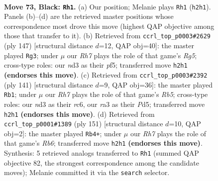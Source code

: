 \documentclass[11pt]{article}
\begin{document}
\clearpage

\begin{figure}[p]\centering
\begin{subfigure}{0.46\textwidth}\centering
\resizebox{\linewidth}{!}{%
\newchessgame
\chessboard[
  setfen={8/8/1k6/8/8/R2N2K1/6Pr/8 b - - 11 73},
  showmover=false,
  pgfstyle=straightmove, color=movearrow, markmove={h2-h1}
]}
\caption{}
\end{subfigure}\hfill
\begin{subfigure}{0.46\textwidth}\centering
\resizebox{\linewidth}{!}{%
\newchessgame
\chessboard[
  setfen={6k1/1R6/8/5P1K/6rP/8/8/8 b - - 14 74},
  showmover=false,
  pgfstyle=straightmove, color=movearrow, markmove={g4-g3}
]}
\caption{}
\end{subfigure}
\\[4pt]
\begin{subfigure}{0.46\textwidth}\centering
\resizebox{\linewidth}{!}{%
\newchessgame
\chessboard[
  setfen={8/8/2R5/3p4/1r1P1k2/2K5/8/8 b - - 1 71},
  showmover=false,
  pgfstyle=straightmove, color=movearrow, markmove={b4-b1}
]}
\caption{}
\end{subfigure}\hfill
\begin{subfigure}{0.46\textwidth}\centering
\resizebox{\linewidth}{!}{%
\newchessgame
\chessboard[
  setfen={6R1/8/7k/8/6K1/1r4P1/8/8 b - - 12 76},
  showmover=false,
  pgfstyle=straightmove, color=movearrow, markmove={b3-b4}
]}
\caption{}
\end{subfigure}
\caption{\textbf{Move 73, Black: \texttt{Rh1}.} (a) Our position; Melanie plays \texttt{Rh1} (\texttt{h2h1}). Panels (b)--(d) are the retrieved master positions whose correspondence most drove this move (highest QAP objective among those that transfer to it). (b) Retrieved from \texttt{ccrl\_top\_p0003\#2629} (ply 147) [structural distance $d$=12, QAP obj=40]: the master played \texttt{Rg3}; under $\mu$ our \emph{Rh7} plays the role of that game's \emph{Rg5}; cross-type roles: our \emph{n}d3 as their \emph{p}f5; transferred move \texttt{h2h1} \textbf{(endorses this move)}. (c) Retrieved from \texttt{ccrl\_top\_p0003\#2392} (ply 141) [structural distance $d$=9, QAP obj=36]: the master played \texttt{Rb1}; under $\mu$ our \emph{Rh7} plays the role of that game's \emph{Rb5}; cross-type roles: our \emph{n}d3 as their \emph{r}c6, our \emph{r}a3 as their \emph{P}d5; transferred move \texttt{h2h1} \textbf{(endorses this move)}. (d) Retrieved from \texttt{ccrl\_top\_p0001\#1389} (ply 151) [structural distance $d$=10, QAP obj=2]: the master played \texttt{Rb4+}; under $\mu$ our \emph{Rh7} plays the role of that game's \emph{Rb6}; transferred move \texttt{h2h1} \textbf{(endorses this move)}. Synthesis: 5 retrieved analogs transferred to \texttt{Rh1} (summed QAP objective 82, the strongest correspondence among the candidate moves); Melanie committed it via the \texttt{search} selector.}
\label{fig:thought-m145}
\end{figure}
\end{document}
